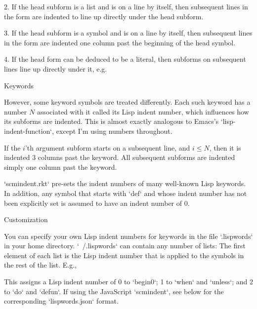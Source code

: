 2. If the head subform is a list and is on a line by itself, then
subsequent lines in the form are indented to
line up directly under the head subform.


3. If the head subform is a symbol and is on a line by itself, then
subsequent lines in the form are indented one column past the beginning
of the head symbol.


4. If the head form can be deduced to be a literal, then subforms on
subsequent lines line up directly under it, e.g.


\beginsection Keywords

However, some keyword symbols are treated differently.  Each such
keyword has a number $N$ associated with it called its Lisp indent number,
which influences how its subforms are indented.  This is almost exactly
analogous to Emacs’s `lisp-indent-function`, except I’m using numbers
throughout.

If
the $i$’th argument subform starts
on a subsequent line, and $i \le N$, then it is indented 3 columns past the
keyword.  All subsequent
subforms are indented simply one column past the keyword.

`scmindent.rkt` pre-sets the indent numbers of many well-known
Lisp keywords.  In addition, any symbol that starts with `def` and whose
indent number has not
been explicitly set is assumed to
have an indent number of 0.

\beginsection Customization

You can specify your own Lisp indent numbers for keywords in the file
`.lispwords` in your home directory.  `~/.lispwords` can contain any number of
lists: The first element of each list is the Lisp indent number that is
applied to the symbols in the rest of the list.  E.g.,

This assigns a Lisp indent number of 0 to `begin0`; 1 to
`when` and `unless`; and 2 to `do` and `defun`.
If using the JavaScript `scmindent`, see below for the
corresponding `lispwords.json` format.

